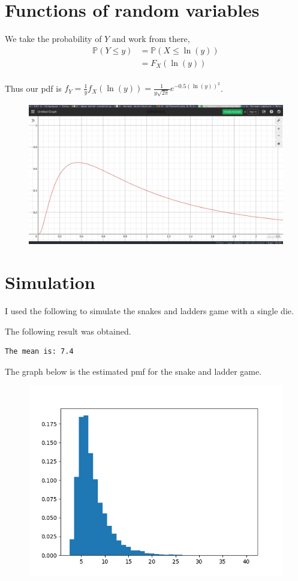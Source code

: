\documentclass{article}
\newcommand{\prob}{\mathbb{P}}
\begin{document}
\section{Functions of random variables}
We take the probability of $Y$ and work from there,
\begin{align*}
    \prob(Y \leq y) &= \prob(X \leq \ln(y)) \\
    &= F_X(\ln(y)) \\
\end{align*}

Thus our pdf is $f_Y = \frac{1}{y} f_X(\ln(y)) = \frac{1}{y\sqrt{2\pi}}e^{-0.5(\ln(y))^2}$.
\begin{figure}[H]
    \centering
    \includegraphics[width=5in]{graph.png}
\end{figure}

\section{Simulation}
I used the following to simulate the snakes and ladders game with a single die.


The following result was obtained.
\begin{verbatim}
The mean is: 7.4
\end{verbatim}

The graph below is the estimated pmf for the snake and ladder game.
\begin{figure}[H]
    \centering
    \includegraphics[width=5in]{graph2.png}
\end{figure}
\end{document}
